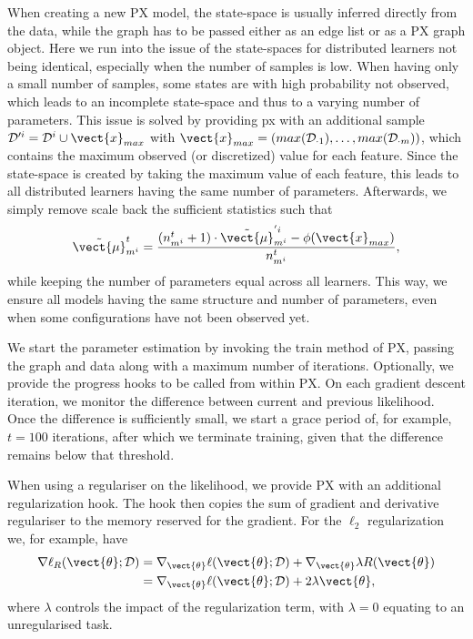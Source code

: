 When creating a new PX model, the state-space is usually inferred directly from the data, while the graph has to be passed either as an edge list or as a PX graph object. 
Here we run into the issue of the state-spaces for distributed learners not being identical, especially when the number of samples is low. 
When having only a small number of samples, some states are with high probability not observed, which leads to an incomplete state-space and thus to a varying number of parameters. 
This issue is solved by providing px with an additional sample $\mathcal{D}'^i = \mathcal{D}^i \cup \vect{x}_{max}$ with $\vect{x}_{max} = (max(\mathcal{D}_{\cdot 1}), \ldots, max(\mathcal{D}_{\cdot m}))$, which contains the maximum observed (or discretized) value for each feature.
Since the state-space is created by taking the maximum value of each feature, this leads to all distributed learners having the same number of parameters.
Afterwards, we simply remove scale back the sufficient statistics such that
\begin{equation}
    \tilde{\vect{\mu}}^t_{m^i} = \frac{(n^t_{m^i} + 1) \cdot \tilde{\vect{\mu}}^{'i}_{m^i} - \phi(\vect{x}_{max})}{n^t_{m^{i}}},
\end{equation}
while keeping the number of parameters equal across all learners.
This way, we ensure all models having the same structure and number of parameters, even when some configurations have not been observed yet.

We start the parameter estimation by invoking the train method of PX, passing the graph and data along with a maximum number of iterations.
Optionally, we provide the progress hooks to be called from within PX.
On each gradient descent iteration, we monitor the difference between current and previous likelihood. 
Once the difference is sufficiently small, we start a grace period of, for example, $t=100$ iterations, after which we terminate training, given that the difference remains below that threshold.

When using a regulariser on the likelihood, we provide PX with an additional regularization hook. 
The hook then copies the sum of gradient and derivative regulariser to the memory reserved for the gradient.
For the $\ell_2$ regularization we, for example, have 
\begin{equation}
    \begin{split}
    \nabla \ell_R( \vect{\theta}; \mathcal{D}) &= \nabla_{\vect{\theta}} \ell( \vect{\theta}; \mathcal{D}) +  \nabla_{\vect{\theta}}\lambda R(\vect{\theta}) \\
    &=\nabla_{\vect{\theta}} \ell( \vect{\theta}; \mathcal{D}) +  2\lambda \vect{\theta},
    \end{split}
\end{equation} 
where $\lambda$ controls the impact of the regularization term, with $\lambda=0$ equating to an unregularised task.

